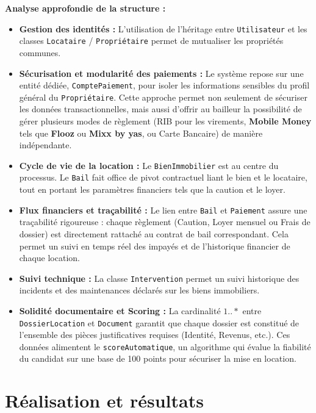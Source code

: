 \documentclass[12pt,a4paper]{report}
\begin{document}
\textbf{Analyse approfondie de la structure :}
\begin{itemize}
\item \textbf{Gestion des identités :} L'utilisation de l'héritage entre \texttt{Utilisateur} et les classes \texttt{Locataire} / \texttt{Propriétaire} permet de mutualiser les propriétés communes.
\item \textbf{Sécurisation et modularité des paiements :} Le système repose sur une entité dédiée, \texttt{ComptePaiement}, pour isoler les informations sensibles du profil général du \texttt{Propriétaire}. Cette approche permet non seulement de sécuriser les données transactionnelles, mais aussi d'offrir au bailleur la possibilité de gérer plusieurs modes de règlement (RIB pour les virements, \textbf{Mobile Money} tels que \textbf{Flooz} ou \textbf{Mixx by yas}, ou Carte Bancaire) de manière indépendante.
\item \textbf{Cycle de vie de la location :} Le \texttt{BienImmobilier} est au centre du processus. Le \texttt{Bail} fait office de pivot contractuel liant le bien et le locataire, tout en portant les paramètres financiers tels que la caution et le loyer.
\item \textbf{Flux financiers et traçabilité :} Le lien entre \texttt{Bail} et \texttt{Paiement} assure une traçabilité rigoureuse : chaque règlement (Caution, Loyer mensuel ou Frais de dossier) est directement rattaché au contrat de bail correspondant. Cela permet un suivi en temps réel des impayés et de l'historique financier de chaque location.
\item \textbf{Suivi technique :} La classe \texttt{Intervention} permet un suivi historique des incidents et des maintenances déclarés sur les biens immobiliers.
\item \textbf{Solidité documentaire et Scoring :} La cardinalité $1..*$ entre \texttt{DossierLocation} et \texttt{Document} garantit que chaque dossier est constitué de l'ensemble des pièces justificatives requises (Identité, Revenus, etc.). Ces données alimentent le \texttt{scoreAutomatique}, un algorithme qui évalue la fiabilité du candidat sur une base de 100 points pour sécuriser la mise en location.
\end{itemize}  


\chapter{Réalisation et résultats}
\end{document}
